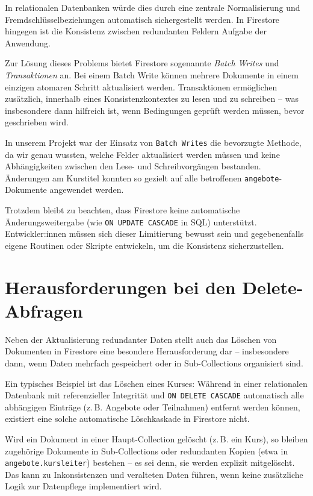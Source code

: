 \documentclass[12pt,a4paper%
              ,oneside     %
              ,titlepage
              ,DIV=13
              ,headinclude
              ,footinclude=false%
              ,cleardoublepage=empty%
              ,parskip=half,
              BCOR=0mm,
              ]{scrreprt}
\begin{document}
In relationalen Datenbanken würde dies durch eine zentrale Normalisierung und Fremdschlüsselbeziehungen automatisch sichergestellt werden. In Firestore hingegen ist die Konsistenz zwischen redundanten Feldern Aufgabe der Anwendung.

Zur Lösung dieses Problems bietet Firestore sogenannte \textit{Batch Writes} und \textit{Transaktionen} an. Bei einem Batch Write können mehrere Dokumente in einem einzigen atomaren Schritt aktualisiert werden. Transaktionen ermöglichen zusätzlich, innerhalb eines Konsistenzkontextes zu lesen und zu schreiben – was insbesondere dann hilfreich ist, wenn Bedingungen geprüft werden müssen, bevor geschrieben wird.

In unserem Projekt war der Einsatz von \texttt{Batch Writes} die bevorzugte Methode, da wir genau wussten, welche Felder aktualisiert werden müssen und keine Abhängigkeiten zwischen den Lese- und Schreibvorgängen bestanden. Änderungen am Kurstitel konnten so gezielt auf alle betroffenen \texttt{angebote}-Dokumente angewendet werden.

Trotzdem bleibt zu beachten, dass Firestore keine automatische Änderungsweitergabe (wie \texttt{ON UPDATE CASCADE} in SQL) unterstützt. Entwickler:innen müssen sich dieser Limitierung bewusst sein und gegebenenfalls eigene Routinen oder Skripte entwickeln, um die Konsistenz sicherzustellen.

\chapter{Herausforderungen bei den Delete-Abfragen}
\label{delete-label}

Neben der Aktualisierung redundanter Daten stellt auch das Löschen von Dokumenten in Firestore eine besondere Herausforderung dar – insbesondere dann, wenn Daten mehrfach gespeichert oder in Sub-Collections organisiert sind.

Ein typisches Beispiel ist das Löschen eines Kurses: Während in einer relationalen Datenbank mit referenzieller Integrität und \texttt{ON DELETE CASCADE} automatisch alle abhängigen Einträge (z.\,B. Angebote oder Teilnahmen) entfernt werden können, existiert eine solche automatische Löschkaskade in Firestore nicht.

Wird ein Dokument in einer Haupt-Collection gelöscht (z.\,B. ein Kurs), so bleiben zugehörige Dokumente in Sub-Collections oder redundanten Kopien (etwa in \texttt{angebote.kursleiter}) bestehen – es sei denn, sie werden explizit mitgelöscht. Das kann zu Inkonsistenzen und veralteten Daten führen, wenn keine zusätzliche Logik zur Datenpflege implementiert wird.
\end{document}
